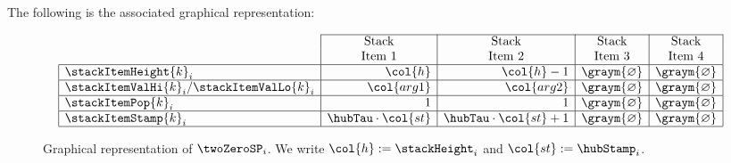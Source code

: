 \noindent The following is the associated graphical representation:
\begin{figure}[h!]
\[
	\begin{array}{|l|r|r|c|c|}
	\cline{2-5}
	\multicolumn{1}{c|}{}                              & \multicolumn{1}{c|}{\text{Stack}}  & \multicolumn{1}{c|}{\text{Stack}}  & \multicolumn{1}{c|}{\text{Stack}}  & \multicolumn{1}{c|}{\text{Stack}}  \\
	\multicolumn{1}{c|}{}                              & \multicolumn{1}{c|}{\text{Item 1}} & \multicolumn{1}{c|}{\text{Item 2}} & \multicolumn{1}{c|}{\text{Item 3}} & \multicolumn{1}{c|}{\text{Item 4}} \\ \hline
	\stackItemHeight {k} _{i}                          & \col{h}                            & \col{h} - 1                        & \graym{\varnothing}                & \graym{\varnothing}                \\ \hline
	\stackItemValHi  {k} _{i} / \stackItemValLo{k}_{i} & \col{arg1}                         & \col{arg2}                         & \graym{\varnothing}                & \graym{\varnothing}                \\ \hline
	\stackItemPop    {k} _{i}                          & 1                                  & 1                                  & \graym{\varnothing}                & \graym{\varnothing}                \\ \hline
	\stackItemStamp  {k} _{i}                          & \hubTau \cdot \col{st}             & \hubTau \cdot \col{st} +  1        & \graym{\varnothing}                & \graym{\varnothing}                \\ \hline
	\end{array}
\]
\caption{%
Graphical representation of $\twoZeroSP_{i}$.
We write $\col{h} := \stackHeight_{i}$ and $\col{st} := \hubStamp_{i}$.}
\end{figure}
